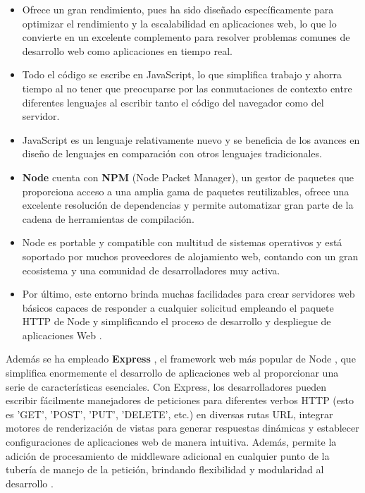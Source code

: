\documentclass[12pt]{article}
\begin{document}
\begin{itemize}
\item Ofrece un gran rendimiento, pues ha sido diseñado específicamente para optimizar el rendimiento y la
escalabilidad en aplicaciones web, lo que lo convierte en un excelente complemento para resolver problemas comunes de desarrollo web como aplicaciones
en tiempo real. 
\item Todo el código se escribe en JavaScript, lo que simplifica trabajo y ahorra tiempo al no tener que preocuparse por las conmutaciones
de contexto entre diferentes lenguajes al escribir tanto el código del navegador como del servidor. 
\item JavaScript es un lenguaje relativamente nuevo y se beneficia de los avances en diseño de lenguajes en comparación con otros lenguajes tradicionales. 
\item \textbf{Node} cuenta con \textbf{NPM} (Node Packet Manager), un gestor de paquetes que proporciona acceso a una amplia gama de paquetes reutilizables, ofrece una excelente resolución de dependencias y permite automatizar
gran parte de la cadena de herramientas de compilación. 
\item Node es portable y compatible con multitud de sistemas operativos y está soportado por muchos proveedores de alojamiento web, contando con un gran ecosistema y una comunidad de desarrolladores muy activa. 
\item Por último, este entorno brinda muchas facilidades para crear servidores web básicos capaces de responder a cualquier solicitud empleando el paquete HTTP de Node y simplificando el proceso de desarrollo y despliegue de
aplicaciones Web \cite{node-express}.
\end{itemize}

Además se ha empleado \textbf{Express} \cite{express}, el framework web más popular de Node \cite{express-popular}, que simplifica enormemente el desarrollo de aplicaciones web al proporcionar
una serie de características esenciales. Con Express, los desarrolladores pueden escribir fácilmente manejadores de peticiones para diferentes 
verbos HTTP (esto es 'GET', 'POST', 'PUT', 'DELETE', etc.) en diversas rutas URL, integrar motores de renderización de vistas para generar respuestas dinámicas y establecer configuraciones de 
aplicaciones web de manera intuitiva. Además, permite la adición de procesamiento de middleware adicional en cualquier punto de la tubería de manejo de 
la petición, brindando flexibilidad y modularidad al desarrollo \cite{node-express}. 
\end{document}
